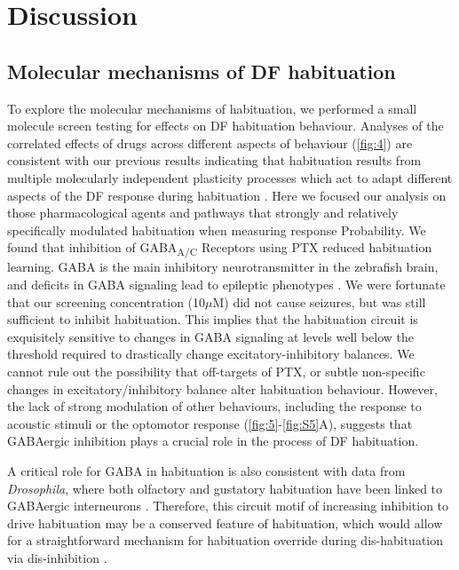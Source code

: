 \documentclass[9pt,lineno]{RandlettLab_elife}
\begin{document}
\section{Discussion}
\subsection{Molecular mechanisms of DF habituation}

To explore the molecular mechanisms of habituation, we performed a small molecule screen testing for effects on DF habituation behaviour. Analyses of the correlated effects of drugs across different aspects of behaviour (\autoref{fig:4}) are consistent with our previous results indicating that habituation results from multiple molecularly independent plasticity processes which act to adapt different aspects of the DF response during habituation \citep{Randlett2019-fi}.  Here we focused our analysis on those pharmacological agents and pathways that strongly and relatively specifically modulated habituation when measuring response Probability. We found that inhibition of GABA\textsubscript{A/C} Receptors using PTX reduced habituation learning. GABA is the main inhibitory neurotransmitter in the zebrafish brain, and deficits in GABA signaling lead to epileptic phenotypes \citep{Baraban2005-xq}. We were fortunate that our screening concentration (10$\mu$M) did not cause seizures, but was still sufficient to inhibit habituation. This implies that the habituation circuit is exquisitely sensitive to changes in GABA signaling at levels well below the threshold required to drastically change excitatory-inhibitory balances. We cannot rule out the possibility that off-targets of PTX, or subtle non-specific changes in excitatory/inhibitory balance alter habituation behaviour. However, the lack of strong modulation of other behaviours, including the response to acoustic stimuli or the optomotor response (\autoref{fig:5}-\autoref{fig:S5}A), suggests that GABAergic inhibition plays a crucial role in the process of DF habituation.

A critical role for GABA in habituation is also consistent with data from \emph{Drosophila}, where both olfactory and gustatory habituation have been linked to GABAergic interneurons \citep{Das2011-gd, Paranjpe2012-ce,Trisal2022-pa}. Therefore, this circuit motif of increasing inhibition to drive habituation may be a conserved feature of habituation, which would allow for a straightforward mechanism for habituation override during dis-habituation via dis-inhibition \citep{Cooke2020-mz, Trisal2022-pa}. 
\end{document}
